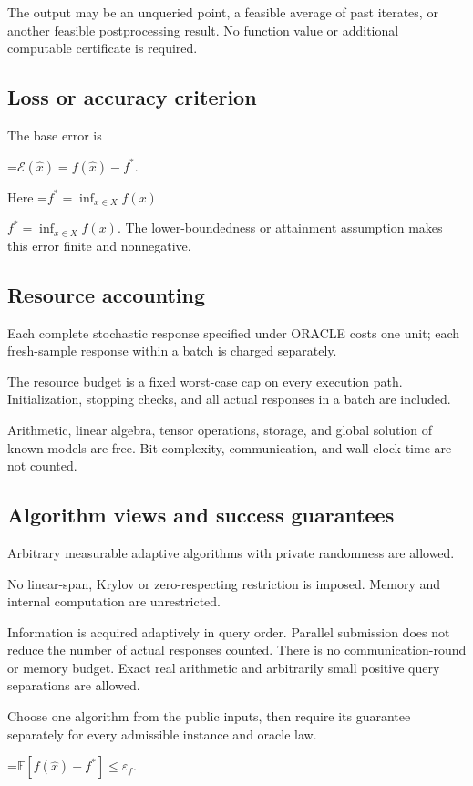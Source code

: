 \documentclass[10pt,a4paper]{article}
\newcommand{\AtlasMath}[1]{\par\begingroup\centering\setbox0=\hbox{$\displaystyle #1$}\ifdim\wd0>1.4\linewidth\typeout{ATLAS WIDE FORMULA: \the\wd0}\fi\ifdim\wd0>\linewidth\resizebox{\linewidth}{!}{\box0}\else\box0\fi\par\endgroup}
\newcommand{\AtlasInlineMath}[1]{\begingroup\setbox0=\hbox{$#1$}\ifdim\wd0>.4\linewidth\endgroup\AtlasMath{#1}\else\endgroup$#1$\fi}
\begin{document}
The output may be an unqueried point, a feasible average of past iterates, or another feasible postprocessing result. No function value or additional computable certificate is required.

\subsection{Loss or accuracy criterion}
The base error is


\AtlasMath{\mathcal{E}(\widehat{x})=f(\widehat{x})-f^*.}


Here \AtlasInlineMath{f^*=\inf_{x\in X}f(x)}. The lower-boundedness or attainment assumption makes this error finite and nonnegative.

\subsection{Resource accounting}
Each complete stochastic response specified under ORACLE costs one unit; each fresh-sample response within a batch is charged separately.

The resource budget is a fixed worst-case cap on every execution path. Initialization, stopping checks, and all actual responses in a batch are included.

Arithmetic, linear algebra, tensor operations, storage, and global solution of known models are free. Bit complexity, communication, and wall-clock time are not counted.

\subsection{Algorithm views and success guarantees}
Arbitrary measurable adaptive algorithms with private randomness are allowed.

No linear-span, Krylov or zero-respecting restriction is imposed. Memory and internal computation are unrestricted.

Information is acquired adaptively in query order. Parallel submission does not reduce the number of actual responses counted. There is no communication-round or memory budget. Exact real arithmetic and arbitrarily small positive query separations are allowed.

Choose one algorithm from the public inputs, then require its guarantee separately for every admissible instance and oracle law.


\AtlasMath{\mathbb{E}\!\left[f(\widehat{x})-f^*\right]\le \varepsilon_f.}
\end{document}
